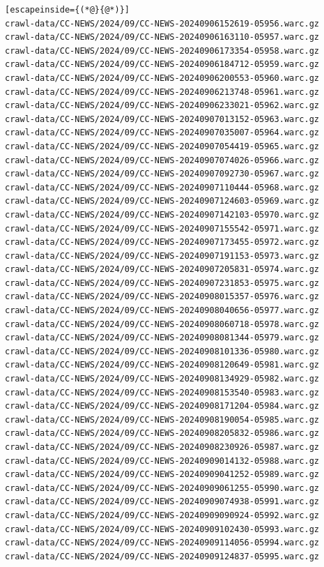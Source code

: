 \begin{lstlisting}[escapeinside={(*@}{@*)}]
crawl-data/CC-NEWS/2024/09/CC-NEWS-20240906152619-05956.warc.gz
crawl-data/CC-NEWS/2024/09/CC-NEWS-20240906163110-05957.warc.gz
crawl-data/CC-NEWS/2024/09/CC-NEWS-20240906173354-05958.warc.gz
crawl-data/CC-NEWS/2024/09/CC-NEWS-20240906184712-05959.warc.gz
crawl-data/CC-NEWS/2024/09/CC-NEWS-20240906200553-05960.warc.gz
crawl-data/CC-NEWS/2024/09/CC-NEWS-20240906213748-05961.warc.gz
crawl-data/CC-NEWS/2024/09/CC-NEWS-20240906233021-05962.warc.gz
crawl-data/CC-NEWS/2024/09/CC-NEWS-20240907013152-05963.warc.gz
crawl-data/CC-NEWS/2024/09/CC-NEWS-20240907035007-05964.warc.gz
crawl-data/CC-NEWS/2024/09/CC-NEWS-20240907054419-05965.warc.gz
crawl-data/CC-NEWS/2024/09/CC-NEWS-20240907074026-05966.warc.gz
crawl-data/CC-NEWS/2024/09/CC-NEWS-20240907092730-05967.warc.gz
crawl-data/CC-NEWS/2024/09/CC-NEWS-20240907110444-05968.warc.gz
crawl-data/CC-NEWS/2024/09/CC-NEWS-20240907124603-05969.warc.gz
crawl-data/CC-NEWS/2024/09/CC-NEWS-20240907142103-05970.warc.gz
crawl-data/CC-NEWS/2024/09/CC-NEWS-20240907155542-05971.warc.gz
crawl-data/CC-NEWS/2024/09/CC-NEWS-20240907173455-05972.warc.gz
crawl-data/CC-NEWS/2024/09/CC-NEWS-20240907191153-05973.warc.gz
crawl-data/CC-NEWS/2024/09/CC-NEWS-20240907205831-05974.warc.gz
crawl-data/CC-NEWS/2024/09/CC-NEWS-20240907231853-05975.warc.gz
crawl-data/CC-NEWS/2024/09/CC-NEWS-20240908015357-05976.warc.gz
crawl-data/CC-NEWS/2024/09/CC-NEWS-20240908040656-05977.warc.gz
crawl-data/CC-NEWS/2024/09/CC-NEWS-20240908060718-05978.warc.gz
crawl-data/CC-NEWS/2024/09/CC-NEWS-20240908081344-05979.warc.gz
crawl-data/CC-NEWS/2024/09/CC-NEWS-20240908101336-05980.warc.gz
crawl-data/CC-NEWS/2024/09/CC-NEWS-20240908120649-05981.warc.gz
crawl-data/CC-NEWS/2024/09/CC-NEWS-20240908134929-05982.warc.gz
crawl-data/CC-NEWS/2024/09/CC-NEWS-20240908153540-05983.warc.gz
crawl-data/CC-NEWS/2024/09/CC-NEWS-20240908171204-05984.warc.gz
crawl-data/CC-NEWS/2024/09/CC-NEWS-20240908190054-05985.warc.gz
crawl-data/CC-NEWS/2024/09/CC-NEWS-20240908205832-05986.warc.gz
crawl-data/CC-NEWS/2024/09/CC-NEWS-20240908230926-05987.warc.gz
crawl-data/CC-NEWS/2024/09/CC-NEWS-20240909014132-05988.warc.gz
crawl-data/CC-NEWS/2024/09/CC-NEWS-20240909041252-05989.warc.gz
crawl-data/CC-NEWS/2024/09/CC-NEWS-20240909061255-05990.warc.gz
crawl-data/CC-NEWS/2024/09/CC-NEWS-20240909074938-05991.warc.gz
crawl-data/CC-NEWS/2024/09/CC-NEWS-20240909090924-05992.warc.gz
crawl-data/CC-NEWS/2024/09/CC-NEWS-20240909102430-05993.warc.gz
crawl-data/CC-NEWS/2024/09/CC-NEWS-20240909114056-05994.warc.gz
crawl-data/CC-NEWS/2024/09/CC-NEWS-20240909124837-05995.warc.gz

\end{lstlisting}
